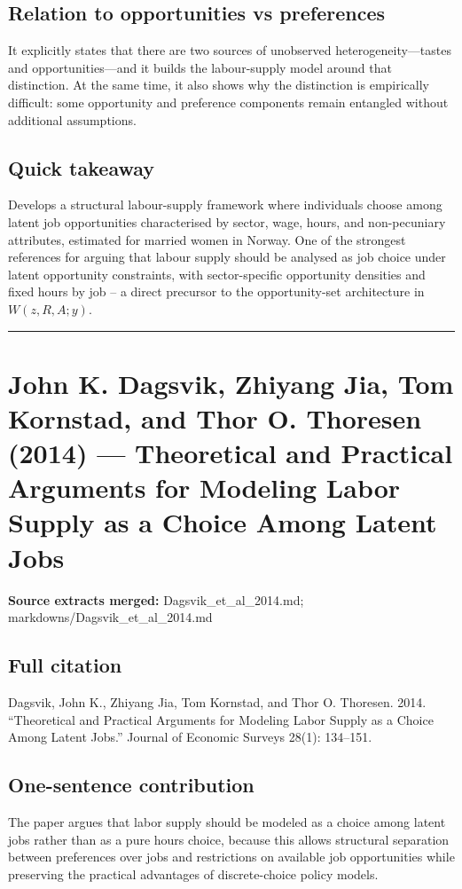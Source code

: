 \documentclass[11pt,a4paper]{article}
\begin{document}
\subsection*{Relation to opportunities vs preferences}
It explicitly states that there are two sources of unobserved heterogeneity—tastes and opportunities—and it builds the labour-supply model around that distinction. At the same time, it also shows why the distinction is empirically difficult: some opportunity and preference components remain entangled without additional assumptions.

\subsection*{Quick takeaway}
Develops a structural labour-supply framework where individuals choose among latent job opportunities characterised by sector, wage, hours, and non-pecuniary attributes, estimated for married women in Norway. One of the strongest references for arguing that labour supply should be analysed as job choice under latent opportunity constraints, with sector-specific opportunity densities and fixed hours by job -- a direct precursor to the opportunity-set architecture in $W(z,R,A;y)$.


\medskip\hrule\medskip

\section*{John K. Dagsvik, Zhiyang Jia, Tom Kornstad, and Thor O. Thoresen (2014) — Theoretical and Practical Arguments for Modeling Labor Supply as a Choice Among Latent Jobs}

\textbf{Source extracts merged:} Dagsvik\_et\_al\_2014.md; markdowns/Dagsvik\_et\_al\_2014.md

\subsection*{Full citation}
Dagsvik, John K., Zhiyang Jia, Tom Kornstad, and Thor O. Thoresen. 2014. “Theoretical and Practical Arguments for Modeling Labor Supply as a Choice Among Latent Jobs.” Journal of Economic Surveys 28(1): 134–151.

\subsection*{One-sentence contribution}
The paper argues that labor supply should be modeled as a choice among latent jobs rather than as a pure hours choice, because this allows structural separation between preferences over jobs and restrictions on available job opportunities while preserving the practical advantages of discrete-choice policy models.
\end{document}
